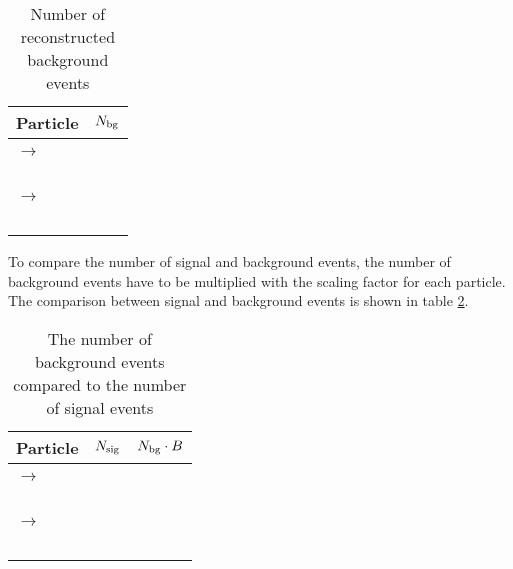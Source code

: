 \begin{table}
	\centering
	\caption{Number of reconstructed background events}
	\label{tab:bg_reco_without_scaling}
	\begin{tabular}{lc}
		\hline
		Particle & $N_{\textnormal{bg}}$ \\
		\hline
		\hline
		&\\
		\pbarpSystem $\rightarrow$ \excitedcascade \anticascade &\\
		\lam & \\
		\alam & \\
		\anticascade & \\
		\excitedcascade & \\
		\excitedcascade \anticascade & \\
		\hline
		\pbarpSystem $\rightarrow$ \cascade \excitedanticascade & \\
		\lam & \\
		\alam & \\
		\cascade & \\
		\excitedanticascade & \\
		\excitedanticascade \cascade &\\
		\hline
		  
	\end{tabular}
\end{table}
To compare the number of signal and background events, the number of background events have to be multiplied with the scaling factor for each particle.
The comparison between signal and background events is shown in table \ref{bg_compared_reco_with_scaling}.

\begin{table}
	\centering
	\caption{\propose The number of background events compared to the number of signal events}
	\label{bg_compared_reco_with_scaling}
	\begin{tabular}{lcc}
		\hline
		Particle & $N_{\textnormal{sig}}$ & $N_{\textnormal{bg}} \cdot B$ \\
		\hline
		\hline
		& &\\
		\pbarpSystem $\rightarrow$ \excitedcascade \anticascade & &\\
		\lam & & \\
		\alam & & \\
		\anticascade & & \\
		\excitedcascade & & \\
		\excitedcascade \anticascade & & \\
		\hline
		\pbarpSystem $\rightarrow$ \cascade \excitedanticascade & & \\
		\lam & & \\
		\alam & & \\
		\cascade & & \\
		\excitedanticascade & & \\
		\excitedanticascade \cascade & &\\
		\hline
		  
	\end{tabular}
\end{table}
	